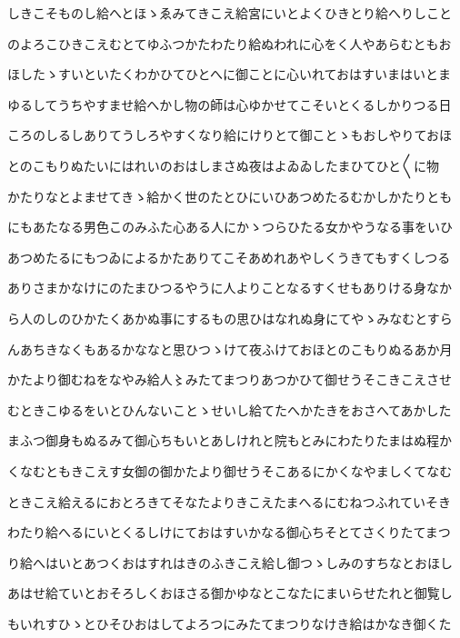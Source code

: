\documentclass[a4paper,11pt,landscape]{ltjtarticle}
\begin{document}
しきこそものし給へとほゝゑみてきこえ給宮にいとよくひきとり給へりしこと
\par\medskip
のよろこひきこえむとてゆふつかたわたり給ぬわれに心をく人やあらむともお
\par\medskip
ほしたゝすいといたくわかひてひとへに御ことに心いれておはすいまはいとま
\par\medskip
ゆるしてうちやすませ給へかし物の師は心ゆかせてこそいとくるしかりつる日
\par\medskip
ころのしるしありてうしろやすくなり給にけりとて御ことゝもおしやりておほ
\par\medskip
とのこもりぬたいにはれいのおはしまさぬ夜はよゐゐしたまひてひと〱に物
\par\medskip
かたりなとよませてきゝ給かく世のたとひにいひあつめたるむかしかたりとも
\par\medskip
にもあたなる男色このみふた心ある人にかゝつらひたる女かやうなる事をいひ
\par\medskip
あつめたるにもつゐによるかたありてこそあめれあやしくうきてもすくしつる
\par\medskip
ありさまかなけにのたまひつるやうに人よりことなるすくせもありける身なか
\par\medskip
ら人のしのひかたくあかぬ事にするもの思ひはなれぬ身にてやゝみなむとすら
\par\medskip
んあちきなくもあるかななと思ひつゝけて夜ふけておほとのこもりぬるあか月
\par\medskip
かたより御むねをなやみ給人〻みたてまつりあつかひて御せうそこきこえさせ
\par\medskip
むときこゆるをいとひんないことゝせいし給てたへかたきをおさへてあかした
\par\medskip
まふつ御身もぬるみて御心ちもいとあしけれと院もとみにわたりたまはぬ程か
\par\medskip
くなむともきこえす女御の御かたより御せうそこあるにかくなやましくてなむ
\par\medskip
ときこえ給えるにおとろきてそなたよりきこえたまへるにむねつふれていそき
\par\medskip
わたり給へるにいとくるしけにておはすいかなる御心ちそとてさくりたてまつ
\par\medskip
り給へはいとあつくおはすれはきのふきこえ給し御つゝしみのすちなとおほし
\par\medskip
あはせ給ていとおそろしくおほさる御かゆなとこなたにまいらせたれと御覧し
\par\medskip
もいれすひゝとひそひおはしてよろつにみたてまつりなけき給はかなき御くた
\par\medskip
\end{document}

